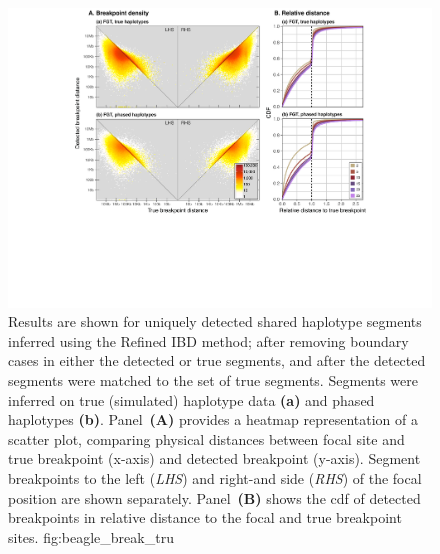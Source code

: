 

\begin{figure}[tb]
\includegraphics[width=\textwidth]{./img/ch3/beagle_break_tru}
{Results are shown for uniquely detected shared haplotype segments inferred using the Refined IBD method; after removing boundary cases in either the detected or true segments, and after the detected segments were matched to the set of true segments.
Segments were inferred on true (simulated) haplotype data \textbf{(a)} and phased haplotypes \textbf{(b)}.
Panel~\textbf{(A)} provides a heatmap representation of a scatter plot, comparing physical distances between focal site and true breakpoint (x-axis) and detected breakpoint (y-axis).
Segment breakpoints to the left (\emph{LHS}) and right-and side (\emph{RHS}) of the focal position are shown separately.
Panel~\textbf{(B)} shows the \gls{cdf} of detected breakpoints in relative distance to the focal and true breakpoint sites.}
{fig:beagle_break_tru}
\end{figure}
